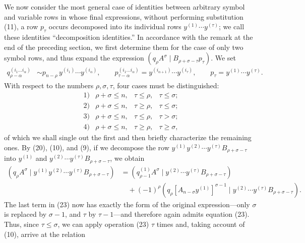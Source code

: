 \documentclass[10pt]{article}
\newcommand{\pair}[2]{(#1\mid #2)}
\begin{document}
We now consider the most general case of identities between arbitrary symbol and variable rows in whose final expressions, without performing substitution (11), a row $p_\tau$ occurs decomposed into its individual rows $y^{(1)}\cdots y^{(\tau)}$; we call these identities ``decomposition identities.'' In accordance with the remark at the end of the preceding section, we first determine them for the case of only two symbol rows, and thus expand the expression $\pair{q_\rho A^\sigma}{B_{\rho+\sigma-\tau}p_\tau}$. We set
\begin{equation}
\begin{aligned}
q_{\rho-\alpha}^{(i_1\ldots i_\alpha)}&\sim p_{n-\rho}\,y^{(i_1)}\cdots y^{(i_\alpha)},\qquad
p_{\tau-\alpha}^{(i_1\ldots i_\alpha)}=y^{(i_{\alpha+1})}\cdots y^{(i_\tau)},\qquad
p_\tau=y^{(1)}\cdots y^{(\tau)}.
\end{aligned}
\tag{22}
\end{equation}
With respect to the numbers $\rho,\sigma,\tau$, four cases must be distinguished:
\[
\begin{array}{llll}
1)&\rho+\sigma\le n,& \tau\le\rho,& \tau\le\sigma;\\[2pt]
2)&\rho+\sigma\le n,& \tau\ge\rho,& \tau\le\sigma;\\[2pt]
3)&\rho+\sigma\le n,& \tau\le\rho,& \tau>\sigma;\\[2pt]
4)&\rho+\sigma\le n,& \tau\ge\rho,& \tau\ge\sigma,
\end{array}
\]
of which we shall single out the first and then briefly characterize the remaining ones. By (20), (10), and (9), if we decompose the row $y^{(1)}y^{(2)}\cdots y^{(\tau)}B_{\rho+\sigma-\tau}$ into $y^{(1)}$ and $y^{(2)}\cdots y^{(\tau)}B_{\rho+\sigma-\tau}$, we obtain
\begin{equation}
\begin{aligned}
\pair{q_\rho A^\sigma}{y^{(1)}y^{(2)}\cdots y^{(\tau)}B_{\rho+\sigma-\tau}}
&=\pair{q_{\rho-1}^{(1)}A^\sigma}{y^{(2)}\cdots y^{(\tau)}B_{\rho+\sigma-\tau}}\\
&\quad+(-1)^\rho\pair{q_\rho[A_{n-\sigma}y^{(1)}]^{\sigma-1}}{y^{(2)}\cdots y^{(\tau)}B_{\rho+\sigma-\tau}}.
\end{aligned}
\tag{23}
\end{equation}
The last term in (23) now has exactly the form of the original expression---only $\sigma$ is replaced by $\sigma-1$, and $\tau$ by $\tau-1$---and therefore again admits equation (23). Thus, since $\tau\le\sigma$, we can apply operation (23) $\tau$ times and, taking account of (10), arrive at the relation
\end{document}
